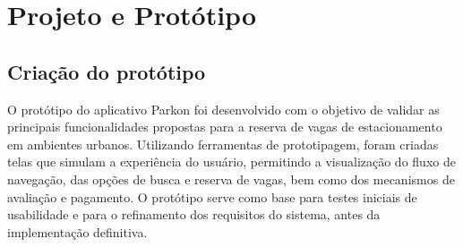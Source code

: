 
\chapter{Projeto e Protótipo}
\label{cap:resultados}

\section{Criação do protótipo}
\label{sec:criacao-prototipo}

O protótipo do aplicativo Parkon foi desenvolvido com o objetivo de validar as principais funcionalidades propostas para a reserva de vagas de estacionamento em ambientes urbanos. Utilizando ferramentas de prototipagem, foram criadas telas que simulam a experiência do usuário, permitindo a visualização do fluxo de navegação, das opções de busca e reserva de vagas, bem como dos mecanismos de avaliação e pagamento. O protótipo serve como base para testes iniciais de usabilidade e para o refinamento dos requisitos do sistema, antes da implementação definitiva.

